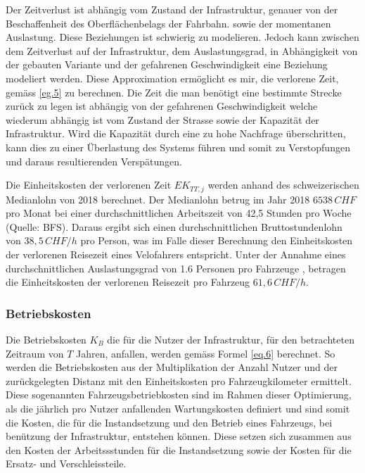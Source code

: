 Der Zeitverlust ist abhängig vom Zustand der Infrastruktur, genauer von der Beschaffenheit des Oberflächenbelags der Fahrbahn. sowie der momentanen Auslastung. Diese Beziehungen ist schwierig zu modelieren. Jedoch kann zwischen dem Zeitverlust auf der Infrastruktur, dem Auslastungsgrad, in Abhängigkeit von der gebauten Variante und der gefahrenen Geschwindigkeit eine Beziehung modeliert werden. Diese Approximation ermöglicht es mir, die verlorene Zeit, gemäss \ref{eg.5} zu berechnen.  
Die Zeit die man benötigt eine bestimmte Strecke zurück zu legen ist abhängig von der gefahrenen Geschwindigkeit welche wiederum abhängig ist vom Zustand der Strasse sowie der Kapazität der Infrastruktur. Wird die Kapazität durch eine zu hohe Nachfrage überschritten, kann dies zu einer Überlastung des Systems führen und somit zu Verstopfungen und daraus resultierenden Verspätungen.  

Die Einheitskosten der verlorenen Zeit $EK_{TT,j}$ werden anhand des schweizerischen Medianlohn von 2018 berechnet. Der Medianlohn betrug im Jahr 2018 $6538 \, CHF$ pro Monat bei einer durchschnittlichen Arbeitszeit von 42,5 Stunden pro Woche (Quelle: BFS). Daraus ergibt sich einen durchschnittlichen Bruttostundenlohn von $38,5 \, CHF/h$ pro Person, was im Falle dieser Berechnung den Einheitskosten der verlorenen Reisezeit eines Velofahrers entspricht. Unter der Annahme eines durchschnittlichen Auslastungsgrad von 1.6 Personen pro Fahrzeuge \cite{Mikrozensus2015}, betragen die Einheitskosten der verlorenen Reisezeit pro Fahrzeug $61,6 \, CHF/h$.



\subsubsection{Betriebskosten}
\label{subsub:Betrieb}


Die Betriebskosten $K_{B}$ die für die Nutzer der Infrastruktur, für den betrachteten Zeitraum von $T$ Jahren, anfallen, werden gemäss Formel \ref{eq.6} berechnet. So werden die Betriebskosten aus der Multiplikation der Anzahl Nutzer und der zurückgelegten Distanz mit den Einheitskosten pro Fahrzeugkilometer ermittelt.
Diese sogenannten Fahrzeugsbetriebkosten sind im Rahmen dieser Optimierung, als die jährlich pro Nutzer anfallenden Wartungskosten definiert und sind somit die Kosten, die für die Instandsetzung und den Betrieb eines Fahrzeugs, bei benützung der Infrastruktur, entstehen können. Diese setzen sich zusammen aus den Kosten der Arbeitssstunden für die Instandsetzung sowie der Kosten für die Ersatz- und Verschleissteile.
 
